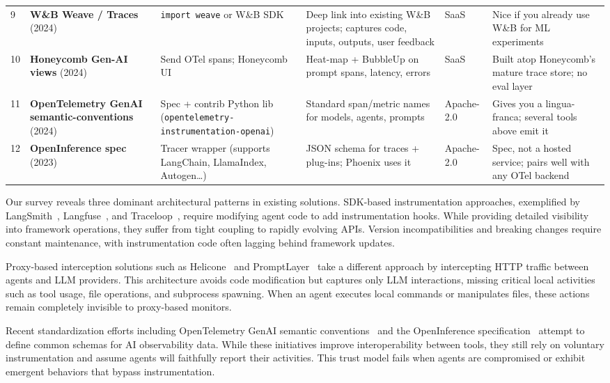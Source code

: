 \begin{table*}[t]
\begin{tabular}{p{0.3cm} p{2.2cm} p{2.5cm} p{2.8cm} p{1.5cm} p{2.2cm}}
9 & \textbf{W\&B Weave / Traces} (2024)~\cite{wandb} & \texttt{import weave} or W\&B SDK & Deep link into existing W\&B projects; captures code, inputs, outputs, user feedback & SaaS & Nice if you already use W\&B for ML experiments \\
10 & \textbf{Honeycomb Gen-AI views} (2024)~\cite{honeycomb} & Send OTel spans; Honeycomb UI & Heat-map + BubbleUp on prompt spans, latency, errors & SaaS & Built atop Honeycomb's mature trace store; no eval layer \\
11 & \textbf{OpenTelemetry GenAI semantic-conventions} (2024)~\cite{semconv} & Spec + contrib Python lib (\texttt{opentelemetry-instrumentation-openai}) & Standard span/metric names for models, agents, prompts & Apache-2.0 & Gives you a lingua-franca; several tools above emit it \\
12 & \textbf{OpenInference spec} (2023)~\cite{openinference} & Tracer wrapper (supports LangChain, LlamaIndex, Autogen…) & JSON schema for traces + plug-ins; Phoenix uses it & Apache-2.0 & Spec, not a hosted service; pairs well with any OTel backend \\
\bottomrule
\end{tabular}
\end{table*}

Our survey reveals three dominant architectural patterns in existing solutions. SDK-based instrumentation approaches, exemplified by LangSmith~\cite{langsmith}, Langfuse~\cite{langfuse}, and Traceloop~\cite{traceloop}, require modifying agent code to add instrumentation hooks. While providing detailed visibility into framework operations, they suffer from tight coupling to rapidly evolving APIs. Version incompatibilities and breaking changes require constant maintenance, with instrumentation code often lagging behind framework updates.

Proxy-based interception solutions such as Helicone~\cite{helicone} and PromptLayer~\cite{promptlayer} take a different approach by intercepting HTTP traffic between agents and LLM providers. This architecture avoids code modification but captures only LLM interactions, missing critical local activities such as tool usage, file operations, and subprocess spawning. When an agent executes local commands or manipulates files, these actions remain completely invisible to proxy-based monitors.

Recent standardization efforts including OpenTelemetry GenAI semantic conventions~\cite{semconv} and the OpenInference specification~\cite{openinference} attempt to define common schemas for AI observability data. While these initiatives improve interoperability between tools, they still rely on voluntary instrumentation and assume agents will faithfully report their activities. This trust model fails when agents are compromised or exhibit emergent behaviors that bypass instrumentation.

